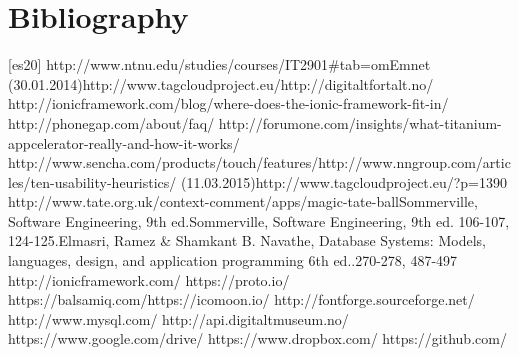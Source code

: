 
\chapter{Bibliography}

[es20] http://www.ntnu.edu/studies/courses/IT2901\#tab=omEmnet (30.01.2014)\newline
[es21] http://www.tagcloudproject.eu/\newline
[es19] http://digitaltfortalt.no/    \newline
[RA1] http://ionicframework.com/blog/where-does-the-ionic-framework-fit-in/ \newline
[RA2] http://phonegap.com/about/faq/ \newline
[RA3] http://forumone.com/insights/what-titanium-appcelerator-really-and-how-it-works/ \newline
[RA4] http://www.sencha.com/products/touch/features/\newline
[AS3] http://www.nngroup.com/articles/ten-usability-heuristics/ (11.03.2015)\newline
[AS4] http://www.tagcloudproject.eu/?p=1390 \newline
[AS5] http://www.tate.org.uk/context-comment/apps/magic-tate-ball\newline
[es16] [es17] [es18] Sommerville, Software Engineering, 9th ed.\newline
[AS1] Sommerville, Software Engineering, 9th ed. 106-107, 124-125.\newline
[AS2] Elmasri, Ramez \& Shamkant B. Navathe, Database Systems: Models, languages, design, and application programming 6th ed..270-278, 487-497 \newline
[es1] http://ionicframework.com/     \newline
[es2] https://proto.io/    \newline
[es3] https://balsamiq.com/\newline
[es4] https://icomoon.io/ \newline
[es5] http://fontforge.sourceforge.net/ \newline
[es8] http://www.mysql.com/ \newline
[es9] http://api.digitaltmuseum.no/ \newline
[es10] https://www.google.com/drive/ \newline
[es11] https://www.dropbox.com/ \newline
[es12] https://github.com/ \newline
